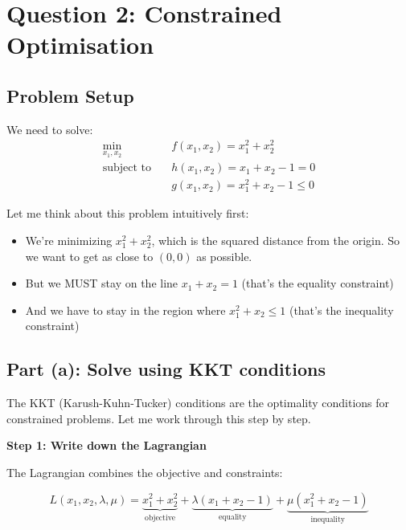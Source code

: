 \documentclass[11pt]{article}
\begin{document}
\newpage

\section{Question 2: Constrained Optimisation}

\subsection{Problem Setup}

We need to solve:
\begin{align*}
\min_{x_1, x_2} \quad & f(x_1, x_2) = x_1^2 + x_2^2 \\
\text{subject to} \quad & h(x_1, x_2) = x_1 + x_2 - 1 = 0 \\
& g(x_1, x_2) = x_1^2 + x_2 - 1 \leq 0
\end{align*}

Let me think about this problem intuitively first:
\begin{itemize}
\item We're minimizing $x_1^2 + x_2^2$, which is the squared distance from the origin. So we want to get as close to $(0,0)$ as possible.
\item But we MUST stay on the line $x_1 + x_2 = 1$ (that's the equality constraint)
\item And we have to stay in the region where $x_1^2 + x_2 \leq 1$ (that's the inequality constraint)
\end{itemize}

\subsection{Part (a): Solve using KKT conditions}

The KKT (Karush-Kuhn-Tucker) conditions are the optimality conditions for constrained problems. Let me work through this step by step.

\vspace{1em}

\textbf{Step 1: Write down the Lagrangian}

The Lagrangian combines the objective and constraints:

\begin{equation*}
L(x_1, x_2, \lambda, \mu) = \underbrace{x_1^2 + x_2^2}_{\text{objective}} + \underbrace{\lambda(x_1 + x_2 - 1)}_{\text{equality}} + \underbrace{\mu(x_1^2 + x_2 - 1)}_{\text{inequality}}
\end{equation*}
\end{document}
